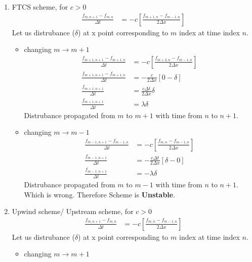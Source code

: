 \documentclass[fleqn,10pt]{SelfArx} %
\begin{document}
\begin{enumerate}
	\item FTCS scheme, for \( c > 0 \)
		\begin{align*}
			\frac{f_{m,n+1} - f_{m,n}}{\Delta t} &= -c\left[\frac{f_{m+1,n} - f_{m-1,n}}{2\Delta x}\right]
		\end{align*}
		Let us distrubance (\( \delta \)) at x point corresponding to \( m \) index at time index \( n \). \\
		\begin{itemize}
			\item changing \( m \rightarrow m+1 \)
			\begin{align*}
				\frac{f_{m+1,n+1} - f_{m+1,n}}{\Delta t} &= -c\left[\frac{f_{m+2,n} - f_{m-1,n}}{2\Delta x}\right] \\
				\frac{f_{m+1,n+1} - f_{m+1,n}}{\Delta t} &= -\frac{c}{2\Delta x}\left[0-\delta\right] \\
				\frac{f_{m+1,n+1}}{\Delta t} &= \frac{c\Delta t}{2\Delta x}\delta \\
				\frac{f_{m+1,n+1}}{\Delta t} &= \lambda\delta \tag{19.4} \label{eq:19.4}
			\end{align*}
			Distrubance propagated from \( m \) to \( m+1 \) with time from \( n \) to \( n +1 \).
			\item changing \( m \rightarrow m-1 \)
			\begin{align*}
				\frac{f_{m-1,n+1} - f_{m-1,n}}{\Delta t} &= -c\left[\frac{f_{m,n} - f_{m-1,n}}{2\Delta x}\right] \\
				\frac{f_{m-1,n+1}}{\Delta t} &= -\frac{c\Delta t}{2\Delta x}[\delta - 0 ] \\
				\frac{f_{m-1,n+1}}{\Delta t} &= -\lambda\delta \tag{19.5} \label{eq:19.5}
			\end{align*}
			Distrubance propagated from \( m \) to \( m-1 \) with time from \( n \) to \( n +1 \). \\
			Which is wrong. Therefore Scheme is \textbf{Unstable}.
		\end{itemize}
	\item Upwind scheme/ Upstream scheme, for \( c > 0 \)
		\begin{align*}
			\frac{f_{m,n+1} - f_{m,n}}{\Delta t} &= -c\left[\frac{f_{m,n} - f_{m-1,n}}{2\Delta x}\right]
		\end{align*}
		Let us distrubance (\( \delta \)) at x point corresponding to \( m \) index at time index \( n \). \\
		\begin{itemize}
			\item changing \( m \rightarrow m+1 \)

\end{itemize}
\end{enumerate}
\end{document}

